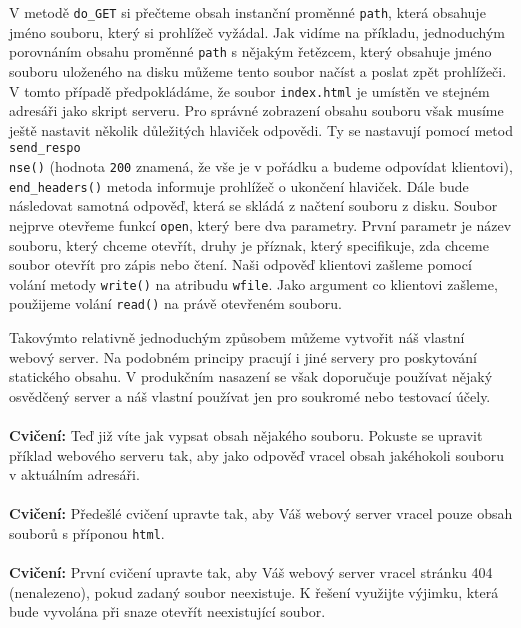 V metodě \texttt{do\_GET} si přečteme obsah instanční proměnné \texttt{path}, která obsahuje jméno souboru, který si prohlížeč vyžádal. Jak vidíme na příkladu, jednoduchým porovnáním obsahu proměnné \texttt{path} s nějakým řetězcem, který obsahuje jméno souboru uloženého na disku můžeme tento soubor načíst a poslat zpět prohlížeči. V tomto případě předpokládáme, že soubor \texttt{index.html} je umístěn ve stejném adresáři jako skript serveru. Pro správné zobrazení obsahu souboru však musíme ještě nastavit několik důležitých hlaviček odpovědi. Ty se nastavují pomocí metod \texttt{send\_respo\\nse()} (hodnota \texttt{200} znamená, že vše je v pořádku a budeme odpovídat klientovi), \texttt{end\_headers()} metoda informuje prohlížeč o ukončení hla\-vi\-ček. Dále bude následovat samotná odpověď, která se skládá z načtení souboru z disku. Soubor nejprve otevřeme funkcí \texttt{open}, který bere dva parametry. První parametr je název souboru, který chceme otevřít, druhy je příznak, který specifikuje, zda chceme soubor otevřít pro zápis nebo čtení. Naši odpověď klientovi zašleme pomocí volání metody \texttt{write()} na atribudu \texttt{wfile}. Jako argument co klientovi zašleme, použijeme volání \texttt{read()} na právě otevřeném souboru.

Takovýmto relativně jednoduchým způsobem můžeme vytvořit náš vlastní webový server. Na podobném principy pracují i jiné servery pro poskytování statického obsahu. V produkčním nasazení se však doporu\-ču\-je používat nějaký osvědčený server a náš vlastní používat jen pro soukromé nebo testovací účely.
\\
\\
\noindent
{\textbf{Cvičení:}}
Teď již víte jak vypsat obsah nějakého souboru. Pokuste se upravit příklad webového serveru tak, aby jako odpověď vracel obsah jakého\-ko\-li souboru v aktuálním adresáři.
\\
\\
\noindent
{\textbf{Cvičení:}}
Předešlé cvičení upravte tak, aby Váš webový server vracel pouze obsah souborů s příponou \texttt{html}.
\\
\\
\noindent
{\textbf{Cvičení:}}
První cvičení upravte tak, aby Váš webový server vracel stránku 404 (nenalezeno), pokud zadaný soubor neexistuje. K řešení využijte výjimku, která bude vyvolána při snaze otevřít neexistující soubor.


